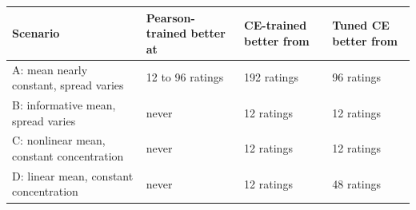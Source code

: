 \begin{tabular}{@{}p{}p{}p{}p{}@{}}
\toprule
Scenario & Pearson-trained better at & CE-trained better from & Tuned CE better from \\
\midrule
A: mean nearly constant, spread varies & 12 to 96 ratings & 192 ratings & 96 ratings \\
B: informative mean, spread varies & never & 12 ratings & 12 ratings \\
C: nonlinear mean, constant concentration & never & 12 ratings & 12 ratings \\
D: linear mean, constant concentration & never & 12 ratings & 48 ratings \\
\bottomrule
\end{tabular}
